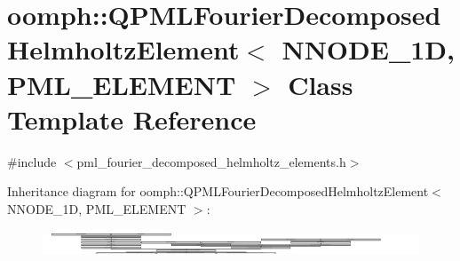 \hypertarget{classoomph_1_1QPMLFourierDecomposedHelmholtzElement}{}\section{oomph\+:\+:Q\+P\+M\+L\+Fourier\+Decomposed\+Helmholtz\+Element$<$ N\+N\+O\+D\+E\+\_\+1D, P\+M\+L\+\_\+\+E\+L\+E\+M\+E\+NT $>$ Class Template Reference}
\label{classoomph_1_1QPMLFourierDecomposedHelmholtzElement}


{\ttfamily \#include $<$pml\+\_\+fourier\+\_\+decomposed\+\_\+helmholtz\+\_\+elements.\+h$>$}

Inheritance diagram for oomph\+:\+:Q\+P\+M\+L\+Fourier\+Decomposed\+Helmholtz\+Element$<$ N\+N\+O\+D\+E\+\_\+1D, P\+M\+L\+\_\+\+E\+L\+E\+M\+E\+NT $>$\+:\begin{figure}[H]
\begin{center}
\leavevmode
\includegraphics[height=0.774550cm]{classoomph_1_1QPMLFourierDecomposedHelmholtzElement}
\end{center}
\end{figure}
